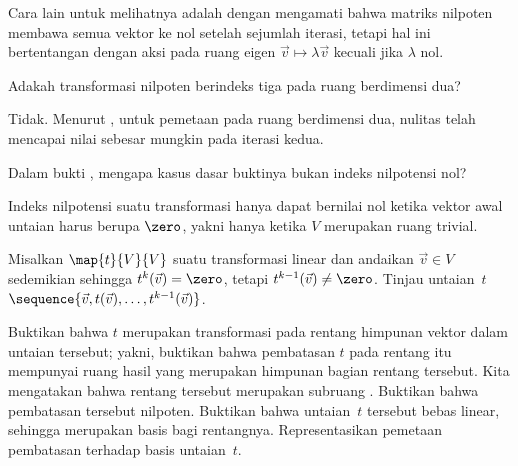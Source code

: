 \begin{exercises}
\begin{answer}
      Cara lain untuk melihatnya adalah dengan mengamati bahwa matriks nilpoten
      membawa semua vektor ke nol setelah sejumlah iterasi, tetapi hal ini
      bertentangan dengan aksi pada ruang eigen
      $\vec{v}\mapsto \lambda\vec{v}$ kecuali jika $\lambda$ nol.
    \end{answer}
  \item 
    Adakah transformasi nilpoten berindeks tiga pada ruang
    berdimensi dua?
    \begin{answer}
      Tidak. Menurut , untuk pemetaan pada
      ruang berdimensi dua, nulitas telah mencapai nilai sebesar mungkin
      pada iterasi kedua.
    \end{answer}
  \item 
    Dalam bukti , mengapa kasus dasar
    buktinya bukan indeks nilpotensi nol?
    \begin{answer}
      Indeks nilpotensi suatu transformasi hanya dapat bernilai nol ketika
      vektor awal untaian harus berupa $\zero$, yakni hanya ketika $V$
      merupakan ruang trivial.
    \end{answer}
  \recommended \item
    Misalkan \( \map{t}{V}{V} \) suatu transformasi linear dan andaikan
    \( \vec{v}\in V \) sedemikian sehingga \( t^k(\vec{v})=\zero \), tetapi
    \( t^{k-1}(\vec{v})\neq\zero \).
    Tinjau untaian~$t$
    $\sequence{\vec{v},t(\vec{v}),\dots,t^{k-1}(\vec{v})}$.
    \begin{exparts}
      \partsitem Buktikan bahwa \( t \) merupakan transformasi pada rentang
        himpunan vektor dalam untaian tersebut; yakni, buktikan bahwa
        pembatasan \( t \) pada rentang itu mempunyai ruang hasil yang
        merupakan himpunan bagian rentang tersebut.
        Kita mengatakan bahwa rentang tersebut merupakan subruang
        .
      \partsitem Buktikan bahwa pembatasan tersebut nilpoten.
      \partsitem Buktikan bahwa untaian~$t$ tersebut
        bebas linear, sehingga merupakan basis bagi rentangnya.
      \partsitem Representasikan pemetaan pembatasan terhadap
        basis untaian~$t$.
    \end{exparts}
    \begin{answer}
\end{answer}
\end{exercises}
